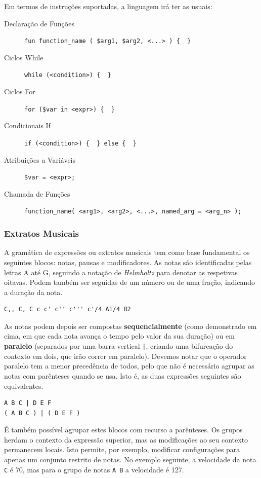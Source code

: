 Em termos de instruções suportadas, a linguagem irá ter as usuais:
\begin{description}
    \item[Declaração de Funções] \verb|fun function_name ( $arg1, $arg2, <...> ) {  }|
    \item[Ciclos While] \verb|while (<condition>) {  }|
    \item[Ciclos For] \verb|for ($var in <expr>) {  }|
    \item[Condicionais If] \verb|if (<condition>) {  } else {  }|
    \item[Atribuições a Variáveis] \verb|$var = <expr>;|
    \item[Chamada de Funções] \verb|function_name( <arg1>, <arg2>, <...>, named_arg = <arg_n> );|
\end{description}

\subsubsection{Extratos Musicais}
A gramática de expressões ou extratos musicais tem como base fundamental os seguintes blocos: notas, pausas e modificadores. As notas são identificadas pelas letras A até G, seguindo a notação de \textit{Helmholtz}\cite{helmholtz-pitch-notation} para denotar as respetivas oitavas. Podem também ser seguidas de um número ou de uma fração, indicando a duração da nota.

\begin{lstlisting}[caption={Exemplos de notas}]
C,, C, C c c' c'' c''' c'/4 A1/4 B2
\end{lstlisting}


As notas podem depois ser compostas \textbf{sequencialmente} (como demonstrado em cima, em que cada nota avança o tempo pelo valor da sua duração) ou em \textbf{paralelo} (separados por uma barra vertical \texttt{|}, criando uma bifurcação do contexto em dois, que irão correr em paralelo). Devemos notar que o operador paralelo tem a menor precedência de todos, pelo que não é necessário agrupar as notas com parênteses quando se usa. Isto é, as duas expressões seguintes são equivalentes.

\begin{lstlisting}
A B C | D E F
( A B C ) | ( D E F )
\end{lstlisting}

É também possível agrupar estes blocos com recurso a parênteses. Os grupos herdam o contexto da expressão superior, mas as modificações ao seu contexto permanecem locais. Isto permite, por exemplo, modificar configurações para apenas um conjunto restrito de notas. No exemplo seguinte, a velocidade da nota \texttt{C} é 70, mas para o grupo de notas \texttt{A B} a velocidade é 127.

